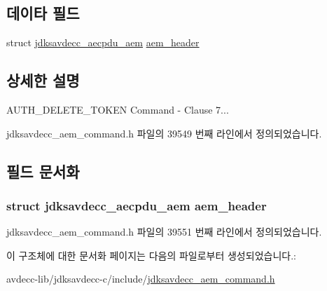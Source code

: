 \subsection*{데이타 필드}
\begin{DoxyCompactItemize}
\item 
struct \hyperlink{structjdksavdecc__aecpdu__aem}{jdksavdecc\+\_\+aecpdu\+\_\+aem} \hyperlink{structjdksavdecc__aem__command__auth__delete__token_ae1e77ccb75ff5021ad923221eab38294}{aem\+\_\+header}
\end{DoxyCompactItemize}


\subsection{상세한 설명}
A\+U\+T\+H\+\_\+\+D\+E\+L\+E\+T\+E\+\_\+\+T\+O\+K\+EN Command -\/ Clause 7... 

jdksavdecc\+\_\+aem\+\_\+command.\+h 파일의 39549 번째 라인에서 정의되었습니다.



\subsection{필드 문서화}
\subsubsection[{\texorpdfstring{aem\+\_\+header}{aem_header}}]{\setlength{\rightskip}{0pt plus 5cm}struct {\bf jdksavdecc\+\_\+aecpdu\+\_\+aem} aem\+\_\+header}\hypertarget{structjdksavdecc__aem__command__auth__delete__token_ae1e77ccb75ff5021ad923221eab38294}{}\label{structjdksavdecc__aem__command__auth__delete__token_ae1e77ccb75ff5021ad923221eab38294}


jdksavdecc\+\_\+aem\+\_\+command.\+h 파일의 39551 번째 라인에서 정의되었습니다.



이 구조체에 대한 문서화 페이지는 다음의 파일로부터 생성되었습니다.\+:\begin{DoxyCompactItemize}
\item 
avdecc-\/lib/jdksavdecc-\/c/include/\hyperlink{jdksavdecc__aem__command_8h}{jdksavdecc\+\_\+aem\+\_\+command.\+h}\end{DoxyCompactItemize}
